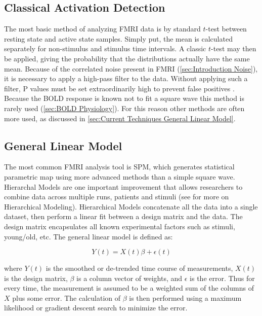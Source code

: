 \subsection{Classical Activation Detection}
\label{sec:Square Wave}
The most basic method of analyzing FMRI data is by standard $t$-test
between resting state and active state samples. Simply put, the
mean is calculated separately for non-stimulus and stimulus time intervals.
A classic $t$-test may then be applied, giving the probability that the
distributions actually have the same mean. Because of the correlated
noise present in FMRI (\autoref{sec:Introduction Noise}), it is necessary
to apply a high-pass filter to the data. Without applying
such a filter, P values must be set extraordinarily high to prevent
false positives \cite{Smith2007}. Because the BOLD response is known
not to fit a square wave this method is rarely used
(\autoref{sec:BOLD Physiology}). For this reason other methods
are often more used, as discussed in 
\autoref{sec:Current Techniques General Linear Model}.

\subsection{General Linear Model}
\label{sec:Current Techniques General Linear Model}
The most common FMRI analysis tool is SPM, which generates
statistical parametric map using more advanced methods than a simple
square wave. Hierarchal
Models are one important improvement that allows researchers
to combine data across multiple runs, patients and stimuli
(see \cite{Hofmann1997} for more on Hierarchical Modeling). 
Hierarchical Models
concatenate all the data into a single dataset, then perform
a linear fit between a design matrix and the data. The design matrix
encapsulates all known experimental factors such as stimuli,
young/old, etc.  The general linear model is defined as:

\begin{equation}
Y(t) = X(t)\beta + \epsilon(t)
\end{equation}

where $Y(t)$ is the smoothed or de-trended time course of measurements,
$X(t)$ is the design matrix, $\beta$ is a column vector of weights,
and $\epsilon$ is the error. Thus for every time, the measurement is
assumed to be a weighted sum of the columns of $X$ plus some error. The calculation
of $\beta$ is then performed using a maximum likelihood or gradient descent search 
to minimize the error. 

